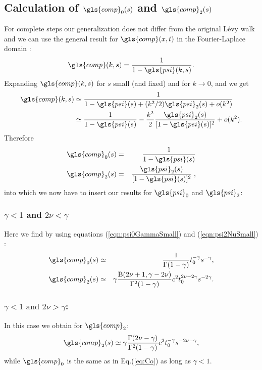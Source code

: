 \subsection{Calculation of $\gls{comp}_0(s)$ and $\gls{comp}_2(s)$}

For complete steps our generalization does not differ from the original L\'evy walk and we can use the general result for $\gls{comp}(x,t)$ in the Fourier-Laplace domain \cite{Sokolov_Klafter}:
\begin{align}
\gls{comp}(k,s) = \frac{1}{1 - \gls{psi}(k,s)}.
\end{align}
Expanding $\gls{comp}(k,s)$ for $s$ small (and fixed) and for $k \to 0$, and we get 
\begin{align}
\begin{split}
\gls{comp}(k,s)  &\simeq \frac{1}{1 - \gls{psi}(s) + (k^2/2) \gls{psi}_2(s) +o(k^2)}\\ &\simeq \frac{1}{1-\gls{psi}(s)} - \frac{k^2}{2}  \frac{\gls{psi}_2(s)}{[1-\gls{psi}(s)]^2} + o(k^2).
\end{split}
\end{align}
Therefore 
\begin{eqnarray}
\gls{comp}_0(s) &=& \frac{1}{1-\gls{psi}(s)}\\
\gls{comp}_2(s) &=& \frac{\gls{psi}_2(s)}{[1-\gls{psi}(s)]^2} \;,
\end{eqnarray}
into which we now have to insert our results for $\gls{psi}_0$ and $\gls{psi}_2$:

\subsubsection{$\gamma<1$ and $2\nu<\gamma$ }
Here we find by using equations (\ref{eqn:psi0GammaSmall}) and (\ref{eqn:psi2NuSmall}) :
\begin{eqnarray}
 \gls{comp}_0(s) &\simeq & \frac{1}{\Gamma(1-\gamma)} t_0^{-\gamma} s^{-\gamma}, \label{eq:Co}\\
 \gls{comp}_2(s) &\simeq & \gamma   \frac{ \mathrm{B}(2\nu+1,\gamma-2\nu)}{\Gamma^2(1-\gamma)} c^2 t_0^{2\nu - 2\gamma} s^{-2 \gamma} .
\end{eqnarray}

\subsubsection{$\gamma<1 \text{ and } 2\nu>\gamma$: }
In this case we obtain for $\gls{comp}_2$:
\begin{equation}
  \gls{comp}_2(s) \simeq  \gamma   \frac{\Gamma(2\nu-\gamma)}{\Gamma^2(1-\gamma)} c^2 t_0^{-\gamma} s^{-2\nu-\gamma},
\end{equation}
while $\gls{comp}_0$ is the same as in Eq.(\ref{eq:Co}) as long as $\gamma<1$.

